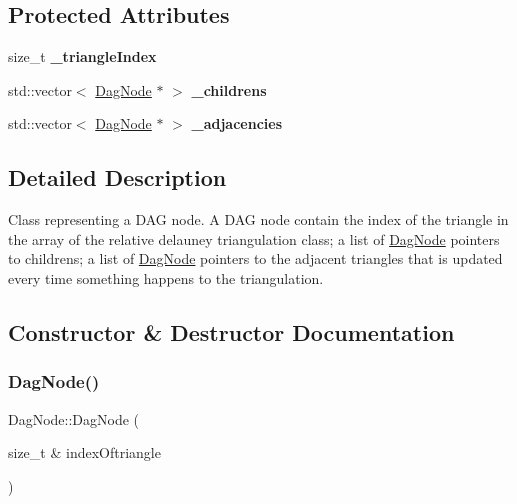 \subsection*{Protected Attributes}
\begin{DoxyCompactItemize}
\item 
\mbox{\label{classDagNode_ac7d609f02e4b2bcd2c9636164496ce78}} 
size\+\_\+t {\bfseries \+\_\+triangle\+Index}
\item 
\mbox{\label{classDagNode_a073e206f34225c1b173d9e9f7e5b0173}} 
std\+::vector$<$ \hyperlink{classDagNode}{Dag\+Node} $\ast$ $>$ {\bfseries \+\_\+childrens}
\item 
\mbox{\label{classDagNode_a5ff072d7f04f759ed8c039578faf0b98}} 
std\+::vector$<$ \hyperlink{classDagNode}{Dag\+Node} $\ast$ $>$ {\bfseries \+\_\+adjacencies}
\end{DoxyCompactItemize}


\subsection{Detailed Description}
Class representing a D\+AG node. A D\+AG node contain the index of the triangle in the array of the relative delauney triangulation class; a list of \hyperlink{classDagNode}{Dag\+Node} pointers to childrens; a list of \hyperlink{classDagNode}{Dag\+Node} pointers to the adjacent triangles that is updated every time something happens to the triangulation. 

\subsection{Constructor \& Destructor Documentation}
\mbox{\label{classDagNode_ad44cf14086cd653ba9ede6762da32e83}} 
\subsubsection{\texorpdfstring{Dag\+Node()}{DagNode()}}
{\footnotesize\ttfamily Dag\+Node\+::\+Dag\+Node (\begin{DoxyParamCaption}\item[{size\+\_\+t \&}]{index\+Oftriangle }\end{DoxyParamCaption})\hspace{0.3cm}{\ttfamily [inline]}}




